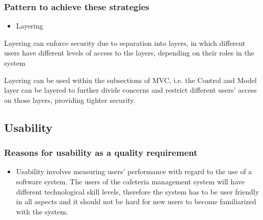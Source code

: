 \documentclass[a4paper,12pt]{article}
\begin{document}
\subsubsection{Pattern to achieve these strategies}
\begin{itemize}
 \item Layering
\end{itemize}

Layering can enforce security due to separation into layers, in which different users have different levels of access to the layers, depending on their roles in the system

Layering can be used within the subsections of MVC, i.e. the Control and Model layer can be layered to further divide concerns and restrict different users' access on those layers, providing tighter security.

\subsection{Usability}

 \subsubsection{Reasons for usability as a quality requirement}
 \begin{itemize}
 \item Usability involves measuring users' performance with regard to the use of a software system. The users of the cafeteria management system will have different technological skill levels, therefore the system has to be user friendly in all aspects and it should not be hard for new users to become familiarized with the system.

 \end{itemize}
\end{document}
